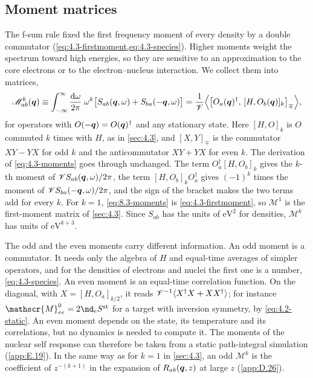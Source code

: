 \subsection{Moment matrices}\label{sec:8.3-moments}

The f-sum rule fixed the first frequency moment of every density by a double commutator (\cref{eq:4.3-firstmoment,eq:4.3-species}). Higher moments weight the spectrum toward high energies, so they are sensitive to an approximation to the core electrons or to the electron--nucleus interaction. We collect them into matrices,
\begin{equation}
  \mathscr{M}^k_{ab}(\bm{q}) \equiv \int_{-\infty}^{\infty}\frac{\mathrm{d}\omega}{2\pi}\;\omega^k\bigl[S_{ab}(\bm{q},\omega) + S_{ba}(-\bm{q},\omega)\bigr]
  = \frac{1}{\mathscr{V}}\Bigl\langle\bigl[O_a(\bm{q})^\dagger,\,[H, O_b(\bm{q})]_k\bigr]_{\mp}\Bigr\rangle ,
  \label{eq:8.3-moments}
\end{equation}
for operators with $O(-\bm{q}) = O(\bm{q})^\dagger$ and any stationary state. Here $[H, O]_k$ is $O$ commuted $k$ times with $H$, as in \cref{sec:4.3}, and $[X, Y]_\mp$ is the commutator $XY - YX$ for odd $k$ and the anticommutator $XY + YX$ for even $k$. The derivation of \cref{eq:4.3-moments} goes through unchanged. The term $O_a^\dagger[H, O_b]_k$ gives the $k$-th moment of $\mathscr{V} S_{ab}(\bm{q},\omega)/2\pi$, the term $[H, O_b]_kO_a^\dagger$ gives $(-1)^k$ times the moment of $\mathscr{V} S_{ba}(-\bm{q},\omega)/2\pi$, and the sign of the bracket makes the two terms add for every $k$. For $k = 1$, \cref{eq:8.3-moments} is \cref{eq:4.3-firstmoment}, so $\mathscr{M}^1$ is the first-moment matrix of \cref{sec:4.3}. Since $S_{ab}$ has the units of $\mathrm{eV}^2$ for densities, $\mathscr{M}^k$ has units of $\mathrm{eV}^{k+3}$.

The odd and the even moments carry different information. An odd moment is a commutator. It needs only the algebra of $H$ and equal-time averages of simpler operators, and for the densities of electrons and nuclei the first one is a number, \cref{eq:4.3-species}. An even moment is an equal-time correlation function. On the diagonal, with $X = [H, O_a]_{k/2}$, it reads $\mathscr{V}^{-1}\langle X^\dagger X + XX^\dagger\rangle$; for instance $\mathscr{M}^0_{ee} = 2\nd_eS^{\mathrm{st}}$ for a target with inversion symmetry, by \cref{eq:4.2-static}. An even moment depends on the state, its temperature and its correlations, but no dynamics is needed to compute it. The moments of the nuclear self response can therefore be taken from a static path-integral simulation (\cref{app:E.19}). In the same way as for $k = 1$ in \cref{sec:4.3}, an odd $\mathscr{M}^k$ is the coefficient of $z^{-(k+1)}$ in the expansion of $R_{ab}(\bm{q}, z)$ at large $z$ (\cref{app:D.26}).

